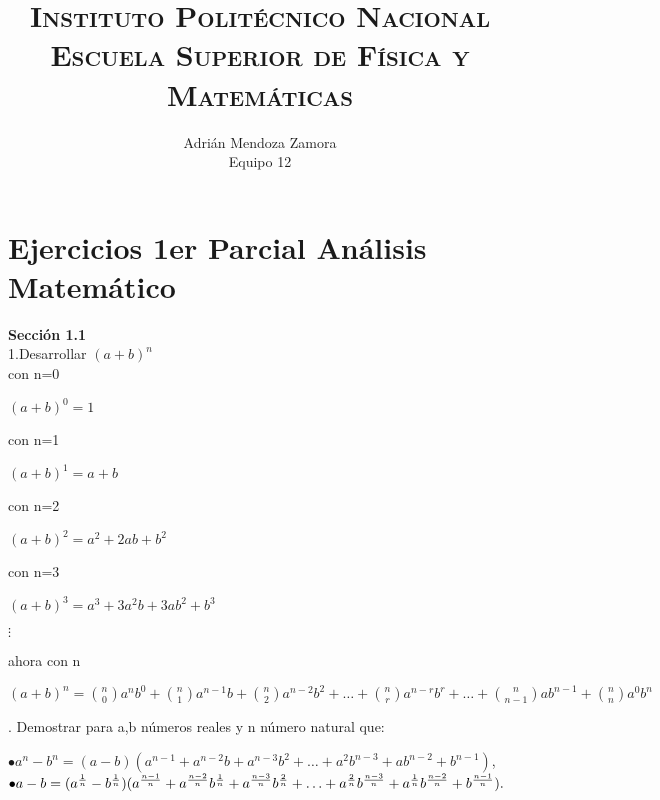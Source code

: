 \documentclass[12pt,a4paper,scrartcl]{article}
\title{	
\normalfont \normalsize 
\textsc{Instituto Polit\'ecnico Nacional\\
Escuela Superior de F\'isica y Matem\'aticas} \\ [0pt] 
}
\author{Adri\'an Mendoza Zamora\\Equipo 12}
\begin{document}
\maketitle


\section{Ejercicios 1er Parcial  An\'alisis Matem\'atico }

\textbf{Secci\'on 1.1}\\

1.Desarrollar $(a+b)^n$\\

con n=0\\
\begin{center}
$(a+b)^0=1$
\end{center}

con n=1\\
\begin{center}
$(a+b)^1=a+b$
\end{center}

con n=2\\
\begin{center}
$(a+b)^2=a^2+2ab+b^2$
\end{center}

con n=3\\
\begin{center}
$(a+b)^3=a^3+3a^2b+3ab^2+b^3$
\end{center}

\begin{center}
$\vdots$
\end{center}

ahora con n\\
\begin{center}
$(a+b)^n=\binom{n}{0}a^nb^0+\binom{n}{1}a^{n-1}b+\binom{n}{2}a^{n-2}b^2+\dots+\binom{n}{r}a^{n-r}b^r+\dots+\binom{n}{n-1}ab^{n-1}+\binom{n}{n}a^0b^n$
\end{center}




. Demostrar para a,b n\'umeros reales y n n\'umero natural que:\\
\begin{center}
$\bullet a^n-b^n = (a-b)(a^{n-1}+a^{n-2}b+a^{n-3}b^2+\hdots+a^{2}b^{n-3}+ab^{n-2}+b^{n-1}) $,\linebreak\ 
\linebreak 
$\bullet a-b = 
(a^{\frac{1}{n}}-b^{\frac{1}{n}})(a^{\frac{n-1}{n}}+a^{\frac{n-2}{n}}b^{\frac{1}{n}}+a^{\frac{n-3}{n}}b^{\frac{2}{n}}+\hdots+a^{\frac{2}{n}}b^{\frac{n-3}{n}}+a^{\frac{1}{n}}b^{\frac{n-2}{n}}+b^{\frac{n-1}{n}}). \linebreak
 $
\end{center}
\end{document}

